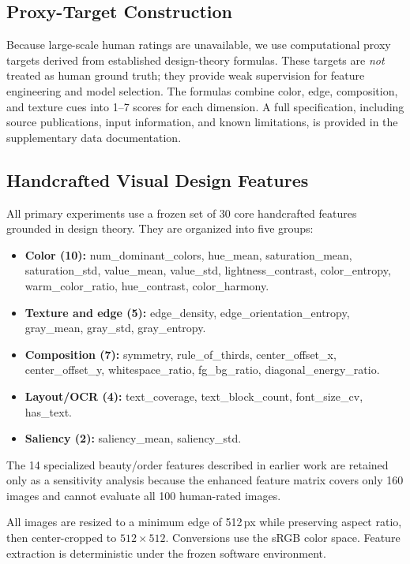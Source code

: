 \subsection{Proxy-Target Construction}
\label{sec:proxy_targets}

Because large-scale human ratings are unavailable, we use computational proxy targets derived from established design-theory formulas. These targets are \emph{not} treated as human ground truth; they provide weak supervision for feature engineering and model selection. The formulas combine color, edge, composition, and texture cues into 1--7 scores for each dimension. A full specification, including source publications, input information, and known limitations, is provided in the supplementary data documentation.

\subsection{Handcrafted Visual Design Features}
\label{sec:features}

All primary experiments use a frozen set of 30 core handcrafted features grounded in design theory. They are organized into five groups:

\begin{itemize}
    \item \textbf{Color (10):} num\_dominant\_colors, hue\_mean, saturation\_mean, saturation\_std, value\_mean, value\_std, lightness\_contrast, color\_entropy, warm\_color\_ratio, hue\_contrast, color\_harmony.
    \item \textbf{Texture and edge (5):} edge\_density, edge\_orientation\_entropy, gray\_mean, gray\_std, gray\_entropy.
    \item \textbf{Composition (7):} symmetry, rule\_of\_thirds, center\_offset\_x, center\_offset\_y, whitespace\_ratio, fg\_bg\_ratio, diagonal\_energy\_ratio.
    \item \textbf{Layout/OCR (4):} text\_coverage, text\_block\_count, font\_size\_cv, has\_text.
    \item \textbf{Saliency (2):} saliency\_mean, saliency\_std.
\end{itemize}

The 14 specialized beauty/order features described in earlier work are retained only as a sensitivity analysis because the enhanced feature matrix covers only 160 images and cannot evaluate all 100 human-rated images.

All images are resized to a minimum edge of 512\,px while preserving aspect ratio, then center-cropped to $512 \times 512$. Conversions use the sRGB color space. Feature extraction is deterministic under the frozen software environment.

